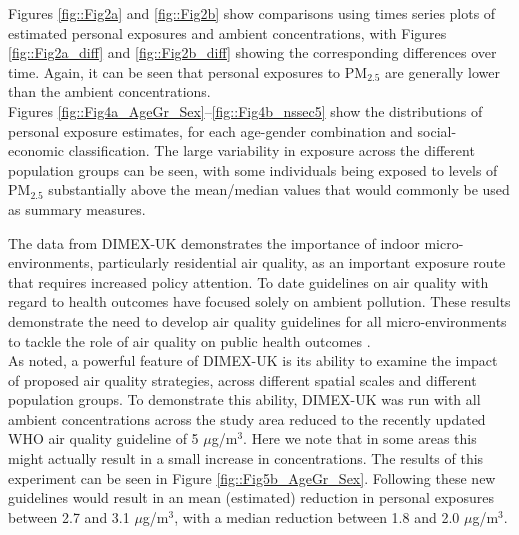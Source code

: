 \documentclass{article}
\begin{document}
\noindent Figures \ref{fig::Fig2a} and \ref{fig::Fig2b} show comparisons using times series plots of estimated personal exposures and ambient concentrations, with Figures \ref{fig::Fig2a_diff} and \ref{fig::Fig2b_diff} showing the corresponding differences over time. Again, it can be seen that personal exposures to PM$_{2.5}$ are generally lower than the ambient concentrations.   \\

\noindent Figures \ref{fig::Fig4a_AgeGr_Sex}--\ref{fig::Fig4b_nssec5} show the distributions of personal exposure estimates, for each age-gender combination and social-economic classification. The large variability in exposure across the different population groups can  be seen, with some individuals being exposed to levels of PM$_{2.5}$ substantially above the mean/median values that would commonly be used as summary measures. 

\noindent The data from DIMEX-UK demonstrates the importance of indoor micro-environments, particularly residential air quality, as an important exposure route that requires increased policy attention. To date guidelines on air quality with regard to health outcomes have focused solely on ambient pollution. These results demonstrate the need to develop air quality guidelines for all micro-environments to tackle the role of air quality on public health outcomes \citep{sharpe2018making} .\\

\noindent As noted, a powerful feature of DIMEX-UK is its ability to examine the impact of proposed air quality strategies, across different spatial scales and different population groups. To demonstrate this ability, DIMEX-UK was run with all  ambient concentrations across the study area  reduced to the recently updated WHO air quality guideline of 5 $\mu$g/m$^{3}$. Here we note that in some areas this might actually result in a small increase in concentrations. The results of this experiment can be seen in Figure \ref{fig::Fig5b_AgeGr_Sex}. Following these new guidelines would result in an mean (estimated) reduction in personal exposures between 2.7 and 3.1 $\mu$g/m$^{3}$, with a median reduction between 1.8 and 2.0 $\mu$g/m$^{3}$.
\end{document}
